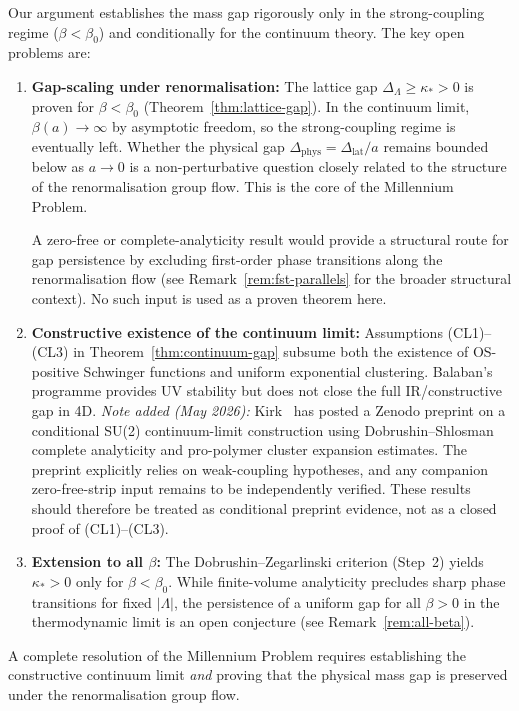 \documentclass[12pt,a4paper]{article}
\theoremstyle{definition}
\theoremstyle{plain}
\theoremstyle{remark}
\begin{document}
Our argument establishes the mass gap rigorously only in the strong-coupling regime ($\beta < \beta_0$) and conditionally for the continuum theory. The key open problems are:
\begin{enumerate}
    \item \textbf{Gap-scaling under renormalisation:} The lattice gap $\Delta_\Lambda \geq \kappa_* > 0$ is proven for $\beta < \beta_0$ (Theorem~\ref{thm:lattice-gap}). In the continuum limit, $\beta(a) \to \infty$ by asymptotic freedom, so the strong-coupling regime is eventually left. Whether the physical gap $\Delta_{\mathrm{phys}} = \Delta_{\mathrm{lat}}/a$ remains bounded below as $a \to 0$ is a non-perturbative question closely related to the structure of the renormalisation group flow. This is the core of the Millennium Problem.

    A zero-free or complete-analyticity result would provide a structural route for gap persistence by excluding first-order phase transitions along the renormalisation flow (see Remark~\ref{rem:fst-parallels} for the broader structural context). No such input is used as a proven theorem here.

    \item \textbf{Constructive existence of the continuum limit:} Assumptions (CL1)--(CL3) in Theorem~\ref{thm:continuum-gap} subsume both the existence of OS-positive Schwinger functions and uniform exponential clustering. Balaban's programme provides UV stability but does not close the full IR/constructive gap in 4D. \emph{Note added (May 2026):} Kirk~\cite{Kirk2026} has posted a Zenodo preprint on a conditional SU(2) continuum-limit construction using Dobrushin--Shlosman complete analyticity and pro-polymer cluster expansion estimates. The preprint explicitly relies on weak-coupling hypotheses, and any companion zero-free-strip input remains to be independently verified. These results should therefore be treated as conditional preprint evidence, not as a closed proof of (CL1)--(CL3).
    \item \textbf{Extension to all $\beta$:} The Dobrushin--Zegarlinski criterion (Step~2) yields $\kappa_* > 0$ only for $\beta < \beta_0$. While finite-volume analyticity precludes sharp phase transitions for fixed $|\Lambda|$, the persistence of a uniform gap for all $\beta > 0$ in the thermodynamic limit is an open conjecture (see Remark~\ref{rem:all-beta}).
\end{enumerate}

A complete resolution of the Millennium Problem requires establishing the constructive continuum limit \emph{and} proving that the physical mass gap is preserved under the renormalisation group flow.
\end{document}
